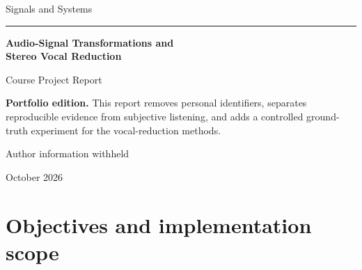 \documentclass[11pt,a4paper]{article}
\begin{document}
\begin{titlepage}
  \centering
  \vspace*{2.0cm}
  {\Large Signals and Systems\par}
  \vspace{0.6cm}
  {\color{accent}\rule{0.82\textwidth}{1.2pt}\par}
  \vspace{0.9cm}
  {\Huge\bfseries Audio-Signal Transformations and\\[0.25em]
  Stereo Vocal Reduction\par}
  \vspace{0.7cm}
  {\Large Course Project Report\par}
  \vfill
  \begin{minipage}{0.82\textwidth}
    \colorbox{soft}{\parbox{0.94\textwidth}{
      \textbf{Portfolio edition.} This report removes personal identifiers,
      separates reproducible evidence from subjective listening, and adds a
      controlled ground-truth experiment for the vocal-reduction methods.
    }}
  \end{minipage}
  \vfill
  {\large Author information withheld\par}
  \vspace{0.3cm}
  {\large October 2026\par}
\end{titlepage}

\begin{abstract}
This project applies core signals-and-systems concepts to digital audio. The
first part demonstrates time reversal and scaling, the discrete Fourier
transform (DFT), magnitude-only and phase-only reconstruction, and ideal
low-pass filtering. The second part studies stereo centre cancellation as a
simple vocal-reduction technique. In addition to the original $L-R$ baseline
and a low-frequency ``bass rescue'' variant, this edition introduces a
gain-and-delay compensated method for imperfectly centred vocals. A synthetic
benchmark with known vocal and accompaniment components shows the central
trade-off: under a two-sample, $0.82\times$ channel mismatch, compensation
improves vocal attenuation from $-10.69$ dB to $-26.54$ dB, while accompaniment
quality falls to $12.06$ dB SDR. The result is therefore an improvement for a
specific failure mode, not a universal vocal separator.
\end{abstract}

\tableofcontents
\newpage

\section{Objectives and implementation scope}
\end{document}
